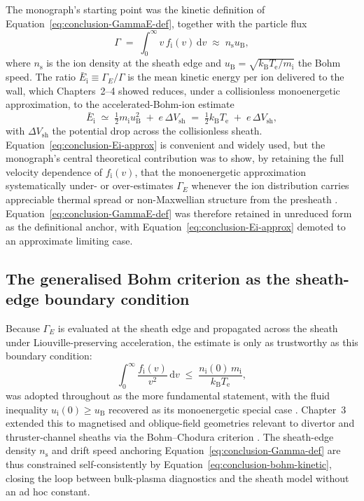 The monograph's starting point was the kinetic definition of Equation~\eqref{eq:conclusion-GammaE-def}, together with the particle flux
\begin{equation}
\Gamma \;=\; \int_{0}^{\infty} v\, f_{\mathrm{i}}(v)\, \mathrm{d}v \;\approx\; n_{\mathrm{s}} u_{\mathrm{B}} ,
\label{eq:conclusion-Gamma-def}
\end{equation}
where $n_{\mathrm{s}}$ is the ion density at the sheath edge and $u_{\mathrm{B}} = \sqrt{k_{\mathrm{B}} T_{\mathrm{e}}/m_{\mathrm{i}}}$ the Bohm speed. The ratio $\bar{E}_{\mathrm{i}} \equiv \Gamma_{E}/\Gamma$ is the mean kinetic energy per ion delivered to the wall, which Chapters~2--4 showed reduces, under a collisionless monoenergetic approximation, to the accelerated-Bohm-ion estimate
\begin{equation}
\bar{E}_{\mathrm{i}} \;\simeq\; \tfrac{1}{2} m_{\mathrm{i}} u_{\mathrm{B}}^{2} \;+\; e\,\Delta V_{\mathrm{sh}} \;=\; \tfrac{1}{2} k_{\mathrm{B}} T_{\mathrm{e}} \;+\; e\,\Delta V_{\mathrm{sh}} ,
\label{eq:conclusion-Ei-approx}
\end{equation}
with $\Delta V_{\mathrm{sh}}$ the potential drop across the collisionless sheath. Equation~\eqref{eq:conclusion-Ei-approx} is convenient and widely used, but the monograph's central theoretical contribution was to show, by retaining the full velocity dependence of $f_{\mathrm{i}}(v)$, that the monoenergetic approximation systematically under- or over-estimates $\Gamma_{E}$ whenever the ion distribution carries appreciable thermal spread or non-Maxwellian structure from the presheath \cite{ref0090}. Equation~\eqref{eq:conclusion-GammaE-def} was therefore retained in unreduced form as the definitional anchor, with Equation~\eqref{eq:conclusion-Ei-approx} demoted to an approximate limiting case.

\subsection{The generalised Bohm criterion as the sheath-edge boundary condition}
\label{ssec:conclusion-bohm}

Because $\Gamma_{E}$ is evaluated at the sheath edge and propagated across the sheath under Liouville-preserving acceleration, the estimate is only as trustworthy as this boundary condition:
\begin{equation}
\int_{0}^{\infty} \frac{f_{\mathrm{i}}(v)}{v^{2}}\, \mathrm{d}v \;\leq\; \frac{n_{\mathrm{i}}(0)\, m_{\mathrm{i}}}{k_{\mathrm{B}} T_{\mathrm{e}}} ,
\label{eq:conclusion-bohm-kinetic}
\end{equation}
was adopted throughout as the more fundamental statement, with the fluid inequality $u_{\mathrm{i}}(0) \geq u_{\mathrm{B}}$ recovered as its monoenergetic special case \cite{ref0001}. Chapter~3 extended this to magnetised and oblique-field geometries relevant to divertor and thruster-channel sheaths via the Bohm--Chodura criterion \cite{ref0017}. The sheath-edge density $n_{\mathrm{s}}$ and drift speed anchoring Equation~\eqref{eq:conclusion-Gamma-def} are thus constrained self-consistently by Equation~\eqref{eq:conclusion-bohm-kinetic}, closing the loop between bulk-plasma diagnostics and the sheath model without an ad hoc constant.

